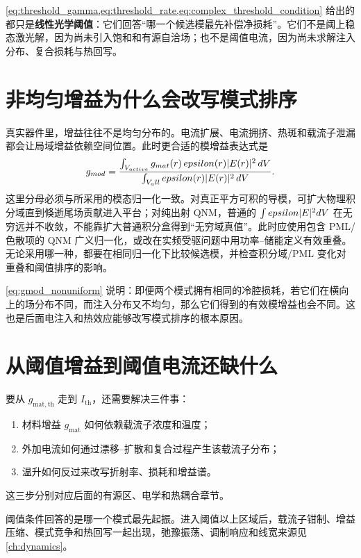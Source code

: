 \cref{eq:threshold_gamma,eq:threshold_rate,eq:complex_threshold_condition} 给出的都只是\textbf{线性光学阈值}：它们回答“哪一个候选模最先补偿净损耗”。它们不是阈上稳态激光解，因为尚未引入饱和和有源自洽场；也不是阈值电流，因为尚未求解注入分布、复合损耗与热回写。

\section{非均匀增益为什么会改写模式排序}
真实器件里，增益往往不是均匀分布的。电流扩展、电流拥挤、热斑和载流子泄漏都会让局域增益依赖空间位置。此时更合适的模增益表达式是
\begin{equation}
g_{mod} = \frac{\int_{V_{active}} g_{mat}(r)\,epsilon(r)|E(r)|^2\,d V}{\int_{V_all} epsilon(r)|E(r)|^2\,d V}.
\label{eq:gmod_nonuniform}
\end{equation}
这里分母必须与所采用的模态归一化一致。对真正平方可积的导模，可扩大物理积分域直到倏逝尾场贡献进入平台；对纯出射 QNM，普通的 $\int epsilon|E|^2d V$ 在无穷远并不收敛，不能靠扩大普通积分盒得到“无穷域真值”。此时应使用包含 PML/色散项的 QNM 广义归一化，或改在实频受驱问题中用功率--储能定义有效重叠。无论采用哪一种，都要在相同归一化下比较候选模，并检查积分域/PML 变化对重叠和阈值排序的影响。

\cref{eq:gmod_nonuniform} 说明：即便两个模式拥有相同的冷腔损耗，若它们在横向上的场分布不同，而注入分布又不均匀，那么它们得到的有效模增益也会不同。这也是后面电注入和热效应能够改写模式排序的根本原因。

\section{从阈值增益到阈值电流还缺什么}
要从 $g_{\mathrm{mat,th}}$ 走到 $I_{\mathrm{th}}$，还需要解决三件事：
\begin{enumerate}
  \item 材料增益 $g_{\mathrm{mat}}$ 如何依赖载流子浓度和温度；
  \item 外加电流如何通过漂移--扩散和复合过程产生该载流子分布；
  \item 温升如何反过来改写折射率、损耗和增益谱。
\end{enumerate}
这三步分别对应后面的有源区、电学和热耦合章节。

阈值条件回答的是哪一个模式最先起振。进入阈值以上区域后，载流子钳制、增益压缩、模式竞争和热回写一起出现，弛豫振荡、调制响应和线宽来源见 \cref{ch:dynamics}。

